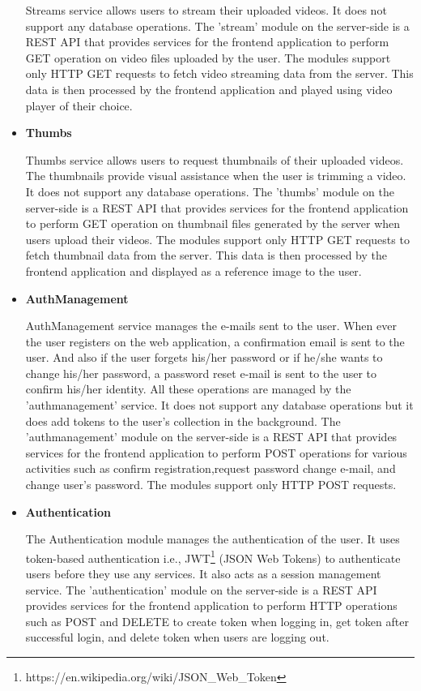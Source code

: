 \begin{itemize}
			\hspace{2cm}Streams service allows users to stream their uploaded videos. It does not support any database operations. The 'stream' module on the server-side is a REST API that provides services for the frontend application to perform GET operation on video files uploaded by the user. The modules support only HTTP GET requests to fetch video streaming data from the server. This data is then processed by the frontend application and played using video player of their choice.
			\vs		
			\item
			\large\textbf{Thumbs}
			
			\hspace{2cm}
			Thumbs service allows users to request thumbnails of their uploaded videos. The thumbnails provide visual assistance when the user is trimming a video. It does not support any database operations. The 'thumbs' module on the server-side is a REST API that provides services for the frontend application to perform GET operation on thumbnail files generated by the server when users upload their videos. The modules support only HTTP GET requests to fetch thumbnail data from the server. This data is then processed by the frontend application and displayed as a reference image to the user.
			\vs		
			
			\item
			\large\textbf{AuthManagement}
			
			\hspace{2cm}
			AuthManagement service manages the e-mails sent to the user. 
			When ever the user registers on the web application, a confirmation email is sent to the user. 
			And also if the user forgets his/her password or if he/she wants to change his/her password, a password reset e-mail is sent to the user to confirm his/her identity. 
			All these operations are managed by the 'authmanagement' service. It does not support any database operations but it does add tokens to the user's collection in the background. 
			The 'authmanagement' module on the server-side is a REST API that provides services for the frontend application to perform POST operations for various activities such as confirm registration,request password change e-mail, and change user's password. The modules support only HTTP POST requests.
			\vs
			
			\item
			\large\textbf{Authentication}
			
			\hspace{2cm}
			The Authentication module manages the authentication of the user. It uses token-based authentication i.e., JWT\footnote{https://en.wikipedia.org/wiki/JSON\_Web\_Token}
			(JSON Web Tokens) to authenticate users before they use any services. It also acts as a session management service. The 'authentication' module on the server-side is a REST API  provides services for the frontend application to perform HTTP operations such as POST and DELETE to create token when logging in, get token after successful login, and delete token when users are logging out.
		\end{itemize}
		\vs
